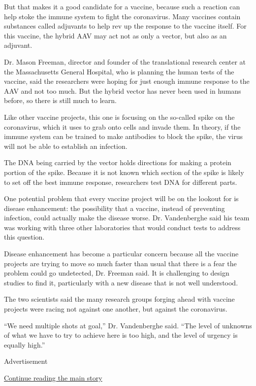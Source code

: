 But that makes it a good candidate for a vaccine, because such a
reaction can help stoke the immune system to fight the coronavirus. Many
vaccines contain substances called adjuvants to help rev up the response
to the vaccine itself. For this vaccine, the hybrid AAV may act not as
only a vector, but also as an adjuvant.

Dr. Mason Freeman, director and founder of the translational research
center at the Massachusetts General Hospital, who is planning the human
tests of the vaccine, said the researchers were hoping for just enough
immune response to the AAV and not too much. But the hybrid vector has
never been used in humans before, so there is still much to learn.

Like other vaccine projects, this one is focusing on the so-called spike
on the coronavirus, which it uses to grab onto cells and invade them. In
theory, if the immune system can be trained to make antibodies to block
the spike, the virus will not be able to establish an infection.

The DNA being carried by the vector holds directions for making a
protein portion of the spike. Because it is not known which section of
the spike is likely to set off the best immune response, researchers
test DNA for different parts.

One potential problem that every vaccine project will be on the lookout
for is disease enhancement: the possibility that a vaccine, instead of
preventing infection, could actually make the disease worse. Dr.
Vandenberghe said his team was working with three other laboratories
that would conduct tests to address this question.

Disease enhancement has become a particular concern because all the
vaccine projects are trying to move so much faster than usual that there
is a fear the problem could go undetected, Dr. Freeman said. It is
challenging to design studies to find it, particularly with a new
disease that is not well understood.

The two scientists said the many research groups forging ahead with
vaccine projects were racing not against one another, but against the
coronavirus.

``We need multiple shots at goal,'' Dr. Vandenberghe said. ``The level
of unknowns of what we have to try to achieve here is too high, and the
level of urgency is equally high.''

Advertisement

\protect\hyperlink{after-bottom}{Continue reading the main story}

